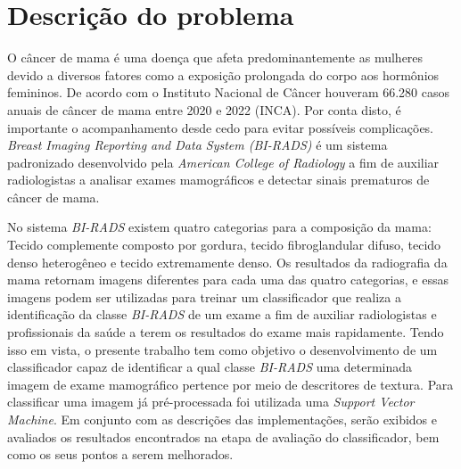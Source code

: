 \section{Descrição do problema}

O câncer de mama é uma doença que afeta predominantemente as mulheres 
devido a diversos fatores como a exposição prolongada do corpo aos hormônios femininos. 
De acordo com o Instituto Nacional de Câncer houveram 66.280 casos anuais 
de câncer de mama entre 2020 e 2022 (INCA). Por conta disto, é importante o acompanhamento 
desde cedo para evitar possíveis complicações. \emph{Breast Imaging Reporting and Data 
System (BI-RADS)} é um sistema padronizado desenvolvido pela \emph{American College of 
Radiology} a fim de auxiliar radiologistas a analisar exames mamográficos e detectar 
sinais prematuros de câncer de mama. 

No sistema \emph{BI-RADS} existem quatro categorias para a composição da mama: Tecido 
complemente composto por gordura, tecido fibroglandular difuso, tecido denso heterogêneo 
e tecido extremamente denso. Os resultados da radiografia da mama retornam imagens 
diferentes para cada uma das quatro categorias, e essas imagens podem ser utilizadas
para treinar um classificador que realiza a identificação da classe \emph{BI-RADS} de um exame 
a fim de auxiliar radiologistas e profissionais da saúde a terem os resultados do exame mais rapidamente. 
Tendo isso em vista, o presente trabalho tem como objetivo o desenvolvimento de um 
classificador capaz de identificar a qual classe \emph{BI-RADS} uma determinada imagem de 
exame mamográfico pertence por meio de descritores de textura. Para classificar uma 
imagem já pré-processada foi utilizada uma \emph{Support Vector Machine}. Em conjunto com 
as descrições das implementações, serão exibidos e avaliados os resultados encontrados 
na etapa de avaliação do classificador, bem como os seus pontos a serem melhorados.

